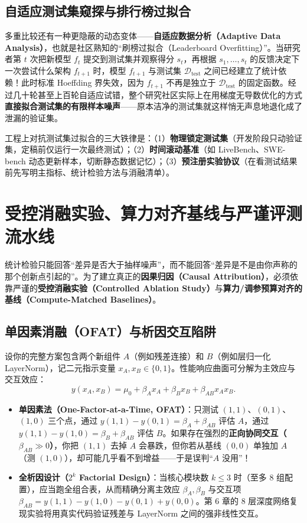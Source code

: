 \subsection{自适应测试集窥探与排行榜过拟合}

多重比较还有一种更隐蔽的动态变体——\textbf{自适应数据分析（Adaptive Data Analysis）}，也就是社区熟知的“刷榜过拟合（Leaderboard Overfitting）”。当研究者第 $t$ 次把新模型 $f_t$ 提交到测试集并观察得分 $s_t$，再根据 $s_1,\dots,s_t$ 的反馈决定下一次尝试什么架构 $f_{t+1}$ 时，模型 $f_{t+1}$ 与测试集 $\mathcal{D}_{\text{test}}$ 之间已经建立了统计依赖！此时标准 Hoeffding 界失效，因为 $f_{t+1}$ 不再是独立于 $\mathcal{D}_{\text{test}}$ 的固定函数。经过几十轮甚至上百轮自适应试错，整个研究社区实际上在用梯度无导数优化的方式\textbf{直接拟合测试集的有限样本噪声}——原本洁净的测试集就这样悄无声息地退化成了泄漏的验证集。

工程上对抗测试集过拟合的三大铁律是：（1）\textbf{物理锁定测试集}（开发阶段只动验证集，定稿前仅运行一次最终测试）；（2）\textbf{时间滚动基准}（如 LiveBench、SWE-bench 动态更新样本，切断静态数据记忆）；（3）\textbf{预注册实验协议}（在看测试结果前先写明主指标、统计检验方法与消融清单）。

\section{受控消融实验、算力对齐基线与严谨评测流水线}

统计检验只能回答“差异是否大于抽样噪声”，而不能回答“差异是不是由你声称的那个创新点引起的”。为了建立真正的\textbf{因果归因（Causal Attribution）}，必须依靠严谨的\textbf{受控消融实验（Controlled Ablation Study）}与\textbf{算力/调参预算对齐的基线（Compute-Matched Baselines）}。

\subsection{单因素消融（OFAT）与析因交互陷阱}

设你的完整方案包含两个新组件 $A$（例如残差连接）和 $B$（例如层归一化 LayerNorm），记二元指示变量 $x_A, x_B \in \{0,1\}$。性能响应曲面可分解为主效应与交互效应：
\[
  y(x_A, x_B) = \mu_0 + \beta_A x_A + \beta_B x_B + \beta_{AB} x_A x_B.
\]
\begin{itemize}
  \item \textbf{单因素法（One-Factor-at-a-Time, OFAT）}：只测试 $(1,1)$、$(0,1)$、$(1,0)$ 三个点，通过 $y(1,1)-y(0,1) = \beta_A + \beta_{AB}$ 评估 $A$，通过 $y(1,1)-y(1,0) = \beta_B + \beta_{AB}$ 评估 $B$。如果存在强烈的\textbf{正向协同交互（$\beta_{AB} \gg 0$）}，你把 $(1,1)$ 去掉 $A$ 会暴跌，但你若从基线 $(0,0)$ 单独加 $A$（测 $(1,0)$），却可能几乎看不到增益——于是误判“$A$ 没用”！
  \item \textbf{全析因设计（$2^k$ Factorial Design）}：当核心模块数 $k \le 3$ 时（至多 $8$ 组配置），应当跑全组合表，从而精确分离主效应 $\beta_A, \beta_B$ 与交互项 $\beta_{AB} = y(1,1) - y(1,0) - y(0,1) + y(0,0)$。第 6 章的 8 层深度网络复现实验将用真实代码验证残差与 LayerNorm 之间的强非线性交互。
\end{itemize}


